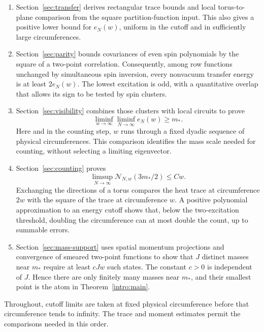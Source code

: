 \begin{enumerate}
\item Section~\ref{sec:transfer} derives rectangular trace bounds and
local torus-to-plane comparison from the square partition-function
input. This also gives a positive lower bound for $e_N(w)$, uniform
in the cutoff and in sufficiently large circumferences.

\item Section~\ref{sec:parity} bounds covariances of even spin
polynomials by the square of a two-point correlation. Consequently,
among row functions unchanged by simultaneous spin inversion, every
nonvacuum transfer energy is at least $2e_N(w)$.
The lowest excitation is odd, with a quantitative overlap
that allows its sign to be tested by spin clusters.

\item Section~\ref{sec:visibility} combines those clusters with local
circuits to prove
\[
 \liminf_{w\to\infty}\liminf_{N\to\infty}e_N(w)\ge m_*.
\]
Here and in the counting step, $w$ runs through a fixed dyadic sequence
of physical circumferences. This comparison identifies the mass scale
needed for counting, without selecting a limiting eigenvector.

\item Section~\ref{sec:counting} proves
\[
 \limsup_{N\to\infty}\mathcal N_{N,w}(3m_*/2)\le Cw.
\]
Exchanging the directions of a torus compares the heat trace at
circumference $2w$ with the square of the trace at circumference $w$.
A positive polynomial approximation to an energy cutoff shows that,
below the two-excitation threshold, doubling the circumference can at
most double the count, up to summable errors.

\item Section~\ref{sec:mass-support} uses spatial momentum projections
and convergence of smeared two-point functions to show that $J$
distinct masses near $m_*$ require at least $cJw$ such states. The
constant $c>0$ is independent of $J$. Hence there are only finitely
many masses near $m_*$, and their smallest point is the atom in
Theorem~\ref{intro:main}.
\end{enumerate}

Throughout, cutoff limits are taken at fixed physical circumference
before that circumference tends to infinity. The trace and moment
estimates permit the comparisons needed in this order.

